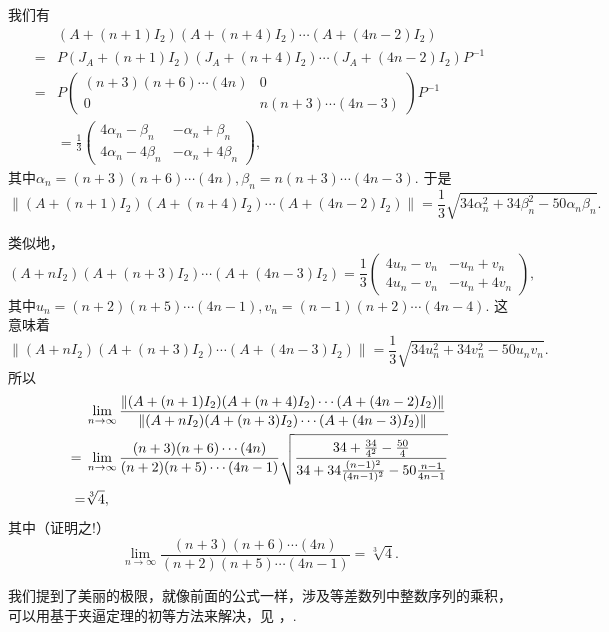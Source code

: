 \begin{solution}
\begin{inparaenum}[(a)]
    \item 我们有
    \begin{align*}
      & (A+(n+1)I_2)(A+(n+4)I_2) \cdots (A+(4n-2)I_2) \\
      = {}& P(J_A+(n+1)I_2)(J_A+(n+4)I_2) \cdots (J_A+(4n-2)I_2) P^{-1} \\
      = {}& P \begin{pmatrix}
        (n+3)(n+6)\cdots(4n) & 0 \\
        0 & n(n+3)\cdots(4n-3)
      \end{pmatrix} P^{-1} \\
      & = \frac13 \begin{pmatrix}
        4\alpha_n - \beta_n & -\alpha_n + \beta_n \\
        4\alpha_n - 4\beta_n & -\alpha_n + 4\beta_n
      \end{pmatrix},
    \end{align*}
    其中$\alpha_n=(n+3)(n+6)\cdots(4n),\beta_n=
    n(n+3)\cdots(4n-3)$. 于是
    \[
      \|(A+(n+1)I_2)(A+(n+4)I_2)\cdots (A+(4n-2)I_2)\| = \frac13\sqrt{34\alpha_n^2+34\beta_n^2-
      50\alpha_n\beta_n}.
    \]

    类似地，
    \[
      (A+nI_2)(A+(n+3)I_2)\cdots(A+(4n-3)I_2) = \frac13 \begin{pmatrix}
        4u_n - v_n & -u_n + v_n \\
        4u_n - v_n & -u_n + 4v_n
      \end{pmatrix},
    \]
    其中$u_n=(n+2)(n+5)\cdots(4n-1),v_n=(n-1)(n+2)\cdots(4n-4)$. 这意味着
    \[
      \|(A+nI_2)(A+(n+3)I_2)\cdots(A+(4n-3)I_2)\| = \frac13\sqrt{34u_n^2+34v_n^2-50u_nv_n}.
    \]
    所以
    \begin{align*}
      & \lim_{n\to\infty} \frac{\|
      (A+(n+1)I_2)(A+(n+4)I_2)\cdots (A+(4n-2)I_2)
      \|}{\|
      (A+nI_2)(A+(n+3)I_2)\cdots (A+(4n-3)I_2)
      \|} \\
      = {}& \lim_{n\to\infty} \frac{(n+3)(n+6)\cdots(4n)}{(n+2)(n+5)\cdots(4n-1)}
      \SQRT{\frac{34+\frac{34}{4^2}-\frac{50}4}{
      34 + 34\frac{(n-1)^2}{(4n-1)^2} - 50 \frac{n-1}{4n-1}
      }} \\
      = & {} \sqrt[3]4,
    \end{align*}
    其中（证明之!）
    \[
      \lim_{n\to\infty} \frac{(n+3)(n+6)\cdots(4n)}{(n+2)(n+5)\cdots(4n-1)}
      = \sqrt[3]4.
    \]
  \end{inparaenum}
\end{solution}
\begin{remark}
  我们提到了美丽的极限，就像前面的公式一样，涉及等差数列中整数序列的乘积，可以用基于夹逼定理的初等方法来解决，见 \cite[problem 59, p.19]{53}，\cite{54,55,56}.
\end{remark}


